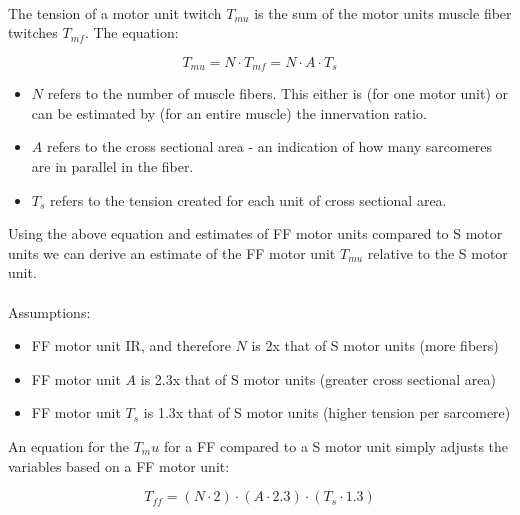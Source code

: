\paragraph{}

The tension of a motor unit twitch $T_{mu}$ is the sum of the motor units muscle fiber twitches $T_{mf}$. The equation:

\begin{equation}
    T_{mu} = N \cdot T_{mf} = N \cdot A \cdot T_s
\end{equation}

\begin{itemize}
    \item $N$ refers to the number of muscle fibers. This either is (for one motor unit) or can be estimated by (for an entire muscle) the innervation ratio.\footnotemark{}
    \item $A$ refers to the cross sectional area - an indication of how many sarcomeres are in parallel in the fiber.
    \item $T_s$ refers to the tension created for each unit of cross sectional area.
\end{itemize}

Using the above equation and estimates of FF motor units compared to S motor units we can derive an estimate of the FF motor unit $T_{mu}$ relative to the S motor unit. 

\paragraph{}
Assumptions:
\begin{itemize}
    \item FF motor unit IR, and therefore $N$ is 2x that of S motor units (more fibers)
    \item FF motor unit $A$ is 2.3x that of S motor units (greater cross sectional area)
    \item FF motor unit $T_s$ is 1.3x that of S motor units (higher tension per sarcomere)
\end{itemize}

An equation for the $T_mu$ for a FF compared to a S motor unit simply adjusts the variables based on a FF motor unit:

\begin{equation}
    T_{ff} = (N \cdot 2) \cdot (A \cdot 2.3) \cdot (T_s \cdot 1.3)
\end{equation}

